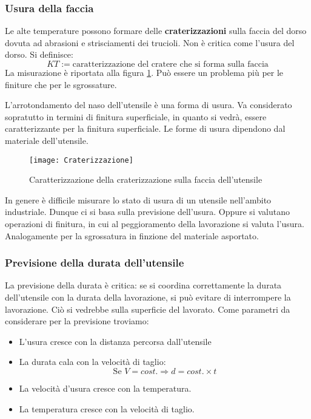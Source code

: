 \subsubsection{Usura della faccia}
Le alte temperature possono formare delle \textbf{craterizzazioni} sulla faccia del dorso dovuta ad abrasioni e strisciamenti dei trucioli.
Non è critica come l'usura del dorso. Si definisce:
\begin{equation}
KT := \text{caratterizzazione del cratere che si forma sulla faccia}
\end{equation}
La misurazione è riportata alla figura \ref{fig:Craterizzazione}.
Può essere un problema più per le finiture che per le sgrossature.

L'arrotondamento del naso dell'utensile è una forma di usura. Va considerato sopratutto in termini di finitura superficiale, in quanto si vedrà, essere caratterizzante per la finitura superficiale.
Le forme di usura dipendono dal materiale dell'utensile.

\begin{figure}
\centering
\texttt{[image: Craterizzazione]}
\caption{Caratterizzazione della craterizzazione sulla faccia dell'utensile}
\label{fig:Craterizzazione}
\end{figure}

In genere è difficile misurare lo stato di usura di un utensile nell'ambito industriale.
Dunque ci si basa sulla previsione dell'usura.
Oppure si valutano operazioni di finitura, in cui al peggioramento della lavorazione si valuta l'usura.
Analogamente per la sgrossatura in finzione del materiale asportato.

\subsubsection{Previsione della durata dell'utensile}
La previsione della durata è critica: se si coordina correttamente la durata dell'utensile con la durata della lavorazione, si può evitare di interrompere la lavorazione. Ciò si vedrebbe sulla superficie del lavorato.
Come parametri da considerare per la previsione troviamo:
\begin{itemize}
\item L'usura cresce con la distanza percorsa dall'utensile
\item La durata cala con la velocità di taglio:
\begin{equation}
\text{Se } V = cost. \Rightarrow d = cost. \times t
\end{equation}
\item La velocità d'usura cresce con la temperatura.
\item La temperatura cresce con la velocità di taglio.
\end{itemize}

